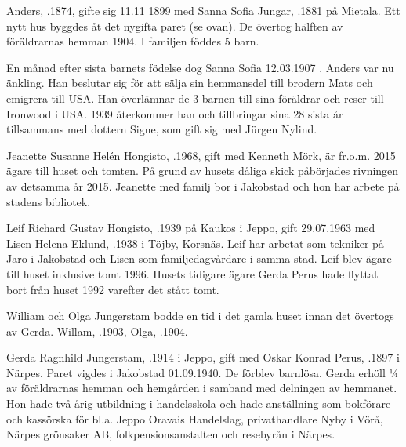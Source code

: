 Anders, .1874, gifte sig 11.11 1899 med Sanna Sofia Jungar, .1881 på Mietala. Ett nytt hus byggdes åt det nygifta paret (se ovan). De övertog hälften av föräldrarnas  hemman 1904. I familjen föddes 5 barn.
\begin{jhchildren}
  \item {}
  \item {}
  \item {}
  \item {}
  \item {}
\end{jhchildren}
En månad efter sista barnets födelse dog Sanna Sofia 12.03.1907 . Anders var nu änkling. Han beslutar sig för att sälja sin hemmansdel till brodern Mats och emigrera till USA. Han överlämnar de 3 barnen till sina föräldrar och reser till Ironwood i USA. 1939 återkommer han och tillbringar sina 28 sista år tillsammans med dottern Signe, som gift sig med Jürgen Nylind.




Jeanette Susanne Helén Hongisto, .1968, gift med Kenneth Mörk, är fr.o.m. 2015 ägare till huset och tomten. På grund av husets dåliga skick påbörjades rivningen av detsamma år 2015. Jeanette med familj bor i Jakobstad och hon har arbete på stadens bibliotek.


Leif Richard Gustav Hongisto, .1939 på Kaukos i Jeppo, gift 29.07.1963 med Lisen Helena Eklund, .1938 i Töjby, Korsnäs. Leif har arbetat som tekniker på Jaro i Jakobstad och Lisen som familjedagvårdare i samma stad. Leif blev ägare till  huset inklusive tomt 1996. Husets tidigare ägare Gerda Perus hade flyttat bort från huset 1992 varefter det stått tomt.

William och Olga Jungerstam bodde en tid i det gamla huset innan det övertogs av Gerda. Willam, .1903, Olga, .1904.


Gerda Ragnhild Jungerstam, .1914 i Jeppo, gift med Oskar Konrad Perus, .1897 i Närpes. Paret vigdes i Jakobstad 01.09.1940. De förblev barnlösa.
Gerda erhöll ¼ av föräldrarnas hemman och hemgården i samband med delningen av hemmanet. Hon hade två-årig utbildning i handelsskola och hade anställning som bokförare och kassörska för bl.a. Jeppo Oravais Handelslag, privathandlare Nyby i Vörå, Närpes grönsaker AB, folkpensionsanstalten och resebyrån i Närpes.


